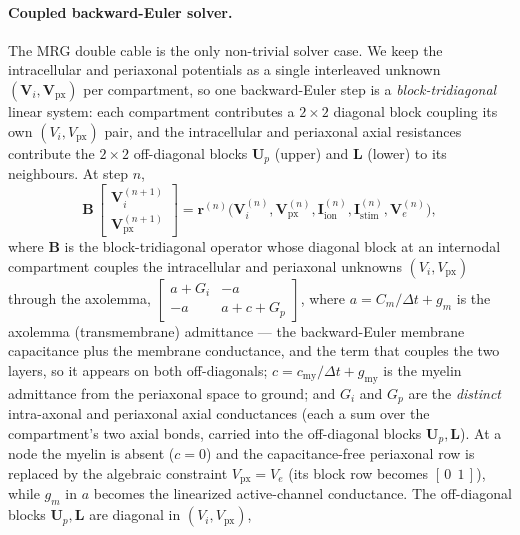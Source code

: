 \paragraph{Coupled backward-Euler solver.}
The MRG double cable is the only non-trivial solver case.  We keep the
intracellular and periaxonal potentials as a single interleaved unknown
$(\mathbf{V}_i, \mathbf{V}_{\mathrm{px}})$ per compartment, so one
backward-Euler step is a \emph{block-tridiagonal} linear system: each
compartment contributes a $2\times2$ diagonal block coupling its own
$(V_i, V_{\mathrm{px}})$ pair, and the intracellular and periaxonal
axial resistances contribute the $2\times2$ off-diagonal blocks
$\mathbf{U}_p$ (upper) and $\mathbf{L}$ (lower) to its neighbours.  At
step $n$,
\begin{equation}
  \mathbf{B}\,
  \left[\begin{smallmatrix}\mathbf{V}_i^{(n+1)}\\ \mathbf{V}_{\mathrm{px}}^{(n+1)}\end{smallmatrix}\right]
  = \mathbf{r}^{(n)}\bigl(\mathbf{V}_i^{(n)},\mathbf{V}_{\mathrm{px}}^{(n)},
    \mathbf{I}_{\mathrm{ion}}^{(n)},\mathbf{I}_{\mathrm{stim}}^{(n)},\mathbf{V}_e^{(n)}\bigr),
  \label{eq:beuler-vi}
\end{equation}
where $\mathbf{B}$ is the block-tridiagonal operator whose diagonal
block at an internodal compartment couples the intracellular and
periaxonal unknowns $(V_i, V_{\mathrm{px}})$ through the axolemma,
$\left[\begin{smallmatrix} a+G_i & -a\\ -a & a+c+G_p\end{smallmatrix}\right]$,
where $a = C_m/\Delta t + g_m$ is the axolemma (transmembrane)
admittance --- the backward-Euler membrane capacitance plus the membrane
conductance, and the term that couples the two layers, so it appears on
both off-diagonals; $c = c_{\mathrm{my}}/\Delta t + g_{\mathrm{my}}$ is
the myelin admittance from the periaxonal space to ground; and $G_i$ and
$G_p$ are the \emph{distinct} intra-axonal and periaxonal axial
conductances (each a sum over the compartment's two axial bonds, carried
into the off-diagonal blocks $\mathbf{U}_p,\mathbf{L}$).  At a node the
myelin is absent ($c = 0$) and the capacitance-free periaxonal row is
replaced by the algebraic constraint $V_{\mathrm{px}} = V_e$ (its block
row becomes $[\,0\ \ 1\,]$), while $g_m$ in $a$ becomes the linearized
active-channel conductance.  The off-diagonal blocks
$\mathbf{U}_p,\mathbf{L}$ are diagonal in $(V_i, V_{\mathrm{px}})$,
